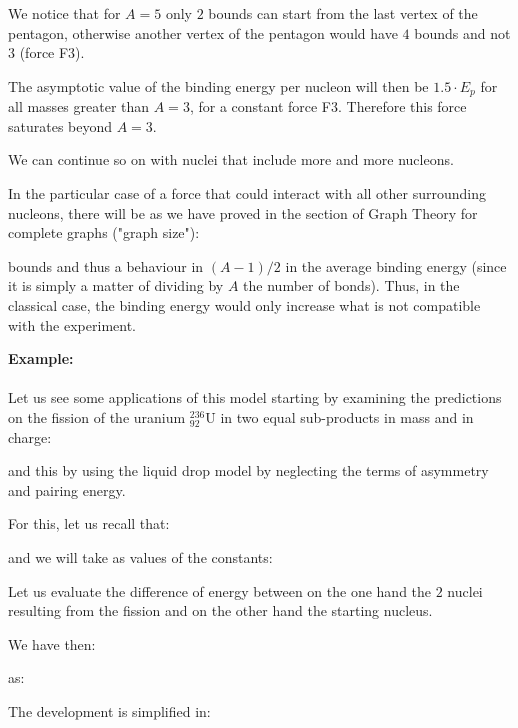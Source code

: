 	\begin{tcolorbox}[title=Remark,colframe=black,arc=10pt]
	We notice that for $A = 5$ only $2$ bounds can start from the last vertex of the pentagon, otherwise another vertex of the pentagon would have $4$ bounds and not $3$ (force F3).
	\end{tcolorbox}
	The asymptotic value of the binding energy per nucleon will then be $1.5\cdot E_p$ for all masses greater than $A = 3$, for a constant force F3. Therefore this force saturates beyond $A = 3$.

	We can continue so on with nuclei that include more and more nucleons.

	In the particular case of a force that could interact with all other surrounding nucleons, there will be as we have proved in the section of Graph Theory for complete graphs ("graph size"):
	
	bounds and thus a behaviour in $(A-1)/2$ in the average binding energy (since it is simply a matter of dividing by $A$ the number of bonds). Thus, in the classical case, the binding energy would only increase what is not compatible with the experiment.
	
	\pagebreak
	\begin{tcolorbox}[colframe=black,colback=white,sharp corners]
	\textbf{{\Large {}}Example:}\\\\
	Let us see some applications of this model starting by examining the predictions on the fission of the uranium $_{92}^{236}\mathrm{U}$ in two equal sub-products in mass and in charge:
	
	and this by using the liquid drop model by neglecting the terms of asymmetry and pairing energy.

	For this, let us recall that:
	
	and we will take as values of the constants:
	
	Let us evaluate the difference of energy between on the one hand the $2$ nuclei resulting from the fission and on the other hand the starting nucleus.

	We have then:
	
	as:
	
	The development is simplified in:
	
	\end{tcolorbox}
	
